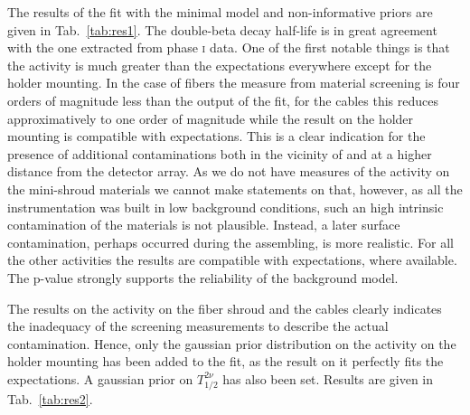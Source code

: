  The results of the fit with the minimal model and non-informative priors are given in Tab.~\ref{tab:res1}. The double-beta decay half-life is in great agreement with the one extracted from phase \textsc{i} data. One of the first notable things is that the  activity is much greater than the expectations everywhere except for the holder mounting. In the case of fibers the measure from material screening is four orders of magnitude less than the output of the fit, for the cables this reduces approximatively to one order of magnitude while the result on the holder mounting is compatible with expectations. This is a clear indication for the presence of additional  contaminations both in the vicinity of and at a higher distance from the detector array. As we do not have measures of the  activity on the mini-shroud materials we cannot make statements on that, however, as all the {\gerda} instrumentation was built in low background conditions, such an high intrinsic contamination of the materials is not plausible. Instead, a later surface contamination, perhaps occurred during the assembling, is more realistic. For all the other activities the results are compatible with expectations, where available. The p-value strongly supports the reliability of the background model.

 The results on the  activity on the fiber shroud and the cables clearly indicates the inadequacy of the screening measurements to describe the actual contamination. Hence, only the gaussian prior distribution on the  activity on the holder mounting has been added to the fit, as the result on it perfectly fits the expectations. A gaussian prior on $T_{1/2}^{2\nu}$ has also been set. Results are given in Tab.~\ref{tab:res2}.

